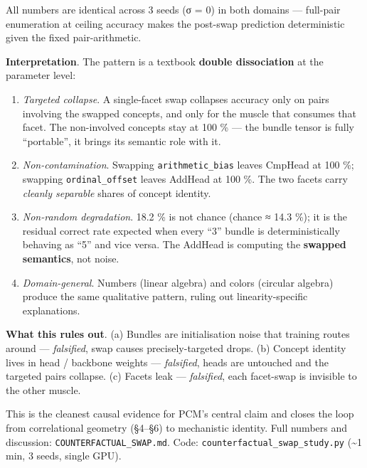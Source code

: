 All numbers are identical across 3 seeds (σ = 0) in both domains ---
full-pair enumeration at ceiling accuracy makes the post-swap
prediction deterministic given the fixed pair-arithmetic.

\textbf{Interpretation}. The pattern is a textbook \textbf{double dissociation}
at the parameter level:

\begin{enumerate}
\def\labelenumi{\arabic{enumi}.}
\tightlist
\item
  \emph{Targeted collapse}. A single-facet swap collapses accuracy only
  on pairs involving the swapped concepts, and only for the muscle
  that consumes that facet. The non-involved concepts stay at
  100 \% --- the bundle tensor is fully ``portable'', it brings its
  semantic role with it.
\item
  \emph{Non-contamination}. Swapping \texttt{arithmetic\_bias} leaves CmpHead at
  100 \%; swapping \texttt{ordinal\_offset} leaves AddHead at 100 \%. The two
  facets carry \emph{cleanly separable} shares of concept identity.
\item
  \emph{Non-random degradation}. 18.2 \% is not chance (chance ≈ 14.3 \%);
  it is the residual correct rate expected when every ``3'' bundle is
  deterministically behaving as ``5'' and vice versa. The AddHead is
  computing the \textbf{swapped semantics}, not noise.
\item
  \emph{Domain-general}. Numbers (linear algebra) and colors (circular
  algebra) produce the same qualitative pattern, ruling out
  linearity-specific explanations.
\end{enumerate}

\textbf{What this rules out}. (a) Bundles are initialisation noise that
training routes around --- \emph{falsified}, swap causes precisely-targeted
drops. (b) Concept identity lives in head / backbone weights ---
\emph{falsified}, heads are untouched and the targeted pairs collapse.
(c) Facets leak --- \emph{falsified}, each facet-swap is invisible to the
other muscle.

This is the cleanest causal evidence for PCM's central claim and
closes the loop from correlational geometry (§4--§6) to mechanistic
identity. Full numbers and discussion: \texttt{COUNTERFACTUAL\_SWAP.md}.
Code: \texttt{counterfactual\_swap\_study.py} (\textasciitilde1 min, 3 seeds, single GPU).

